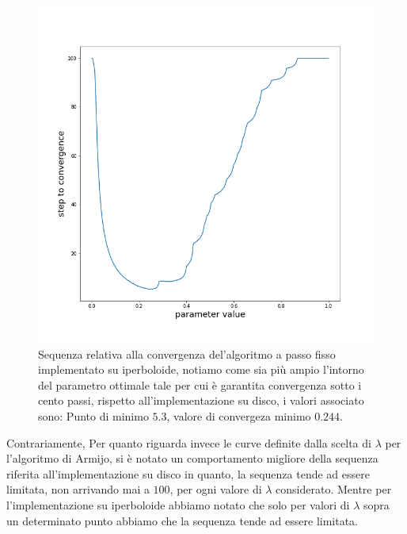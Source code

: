 \documentclass[a4paper, 12pt]{article}
\begin{document}
\begin{figure}[t] %
    \centering\includegraphics[width=1\textwidth]{fixed_step_parameter_hyperboloid.png}
    \caption{Sequenza relativa alla convergenza del'algoritmo a passo fisso implementato su iperboloide, notiamo come sia più ampio l'intorno del parametro ottimale tale per cui è garantita convergenza sotto i cento passi, rispetto all'implementazione su disco, i valori associato sono: Punto di minimo $5.3$, valore di convergeza minimo $0.244$.}
\end{figure}
Contrariamente, Per quanto riguarda invece le curve definite dalla scelta di $\lambda$ per l'algoritmo di Armijo, si è notato un comportamento migliore della sequenza riferita all'implementazione su disco in quanto, la sequenza tende ad essere limitata, non arrivando mai a $100$, per ogni valore di $\lambda$ considerato. Mentre per l'implementazione su iperboloide abbiamo notato che solo per valori di $\lambda$ sopra un determinato punto abbiamo che la sequenza tende ad essere limitata.\\
\end{document}
